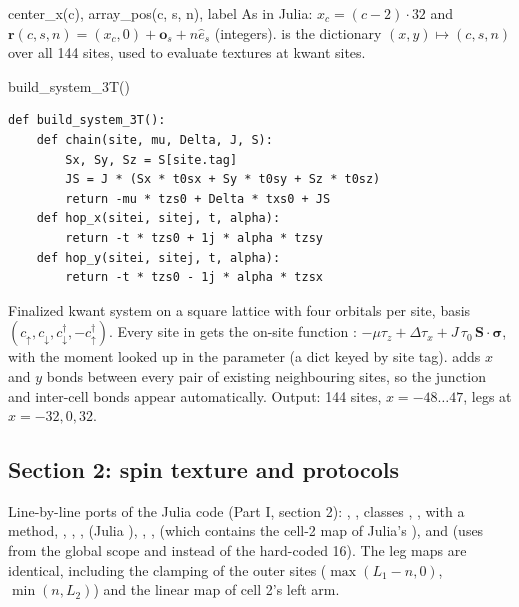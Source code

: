 \begin{function}{center\_x(c), array\_pos(c, s, n), label}
As in Julia: $x_c = (c - 2)\cdot32$ and $\mathbf r(c,s,n) = (x_c,0) + \mathbf o_s + n\hat e_s$ (integers).  is the dictionary
$(x,y)\mapsto(c,s,n)$ over all 144 sites, used to evaluate textures at kwant sites.
\end{function}

\begin{function}{build\_system\_3T()}
\begin{Verbatim}
def build_system_3T():
    def chain(site, mu, Delta, J, S):
        Sx, Sy, Sz = S[site.tag]
        JS = J * (Sx * t0sx + Sy * t0sy + Sz * t0sz)
        return -mu * tzs0 + Delta * txs0 + JS
    def hop_x(sitei, sitej, t, alpha):
        return -t * tzs0 + 1j * alpha * tzsy
    def hop_y(sitei, sitej, t, alpha):
        return -t * tzs0 - 1j * alpha * tzsx
\end{Verbatim}
Finalized kwant system on a square lattice with four orbitals per site, basis $(c_\uparrow, c_\downarrow, c^\dagger_\downarrow, -c^\dagger_\uparrow)$.
Every site in  gets the on-site function : $-\mu\tau_z + \Delta\tau_x + J\,\tau_0\,\mathbf S\cdot\boldsymbol\sigma$, with the
moment looked up in the parameter  (a dict keyed by site tag).  adds $x$ and $y$ bonds between every pair of
existing neighbouring sites, so the junction and inter-cell bonds appear automatically. Output: 144 sites, $x = -48\dots47$, legs at
$x = -32, 0, 32$.
\end{function}

\subsection{Section 2: spin texture and protocols}

Line-by-line ports of the Julia code (Part I, section 2): , , classes , ,
 with a  method, , , , 
(Julia ), , ,  (which contains the cell-2 map of Julia's ),
and  (uses  from the global scope and  instead of the hard-coded 16). The leg maps are identical,
including the clamping of the outer sites ($\max(L_1-n, 0)$, $\min(n, L_2)$) and the linear map of cell 2's left arm.

